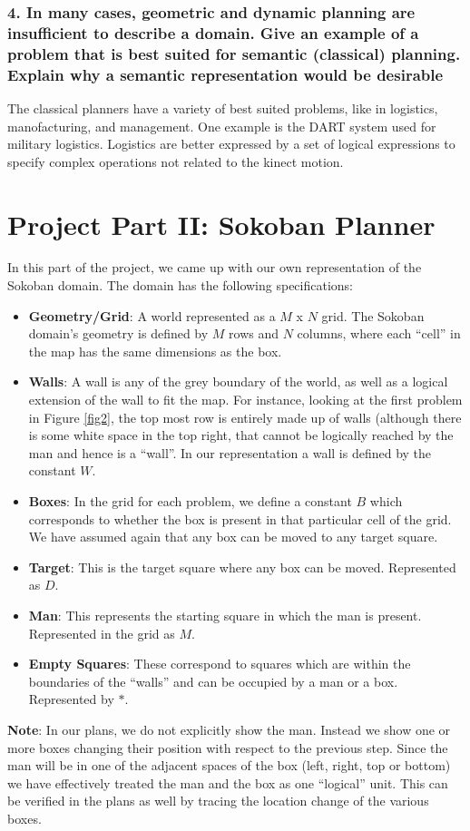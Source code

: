 \documentclass[10pt, letter]{article}
\begin{document}
\subsubsection*{4. In many cases, geometric and dynamic planning are insufficient to describe a domain. Give
an example of a problem that is best suited for semantic (classical) planning. Explain why a
semantic representation would be desirable}

The classical planners have a variety of best suited problems, like in logistics, manofacturing, and management. One example is the DART system used for military logistics. Logistics are better expressed by a set of logical expressions to specify complex operations not related to the kinect motion.


\section{Project Part II: Sokoban Planner}
In this part of the project, we came up with our own representation of the Sokoban domain. The domain has the following specifications:
\begin{itemize}
	\item \textbf{Geometry/Grid}: A world represented as a $M$ x $N$ grid. The Sokoban domain's geometry is defined by $M$ rows and $N$ columns, where each ``cell'' in the map has the same dimensions as the box.
	\item \textbf{Walls}: A wall is any of the grey boundary of the world, as well as a logical extension of the wall to fit the map. For instance, looking at the first problem in Figure \ref{fig2}, the top most row is entirely made up of walls (although there is some white space in the top right, that cannot be logically reached by the man and hence is a ``wall''. In our representation a wall is defined by the constant $W$.
	\item \textbf{Boxes}: In the grid for each problem, we define a constant $B$ which corresponds to whether the box is present in that particular cell of the grid. We have assumed again that any box can be moved to any target square.
	\item \textbf{Target}: This is the target square where any box can be moved. Represented as $D$.
	\item \textbf{Man}: This represents the starting square in which the man is present. Represented in the grid as $M$.
	\item \textbf{Empty Squares}: These correspond to squares which are within the boundaries of the ``walls'' and can be occupied by a man or a box. Represented by $*$.
\end{itemize}
\textbf{Note}: In our plans, we do not explicitly show the man. Instead we show one or more boxes changing their position with respect to the previous step. Since the man will be in one of the adjacent spaces of the box (left, right, top or bottom) we have effectively treated the man and the box as one ``logical'' unit. This can be verified in the plans as well by tracing the location change of the various boxes.
\end{document}
